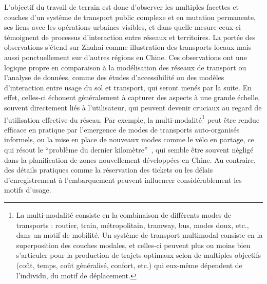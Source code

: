 {L'objectif du travail de terrain est donc d'observer les multiples facettes et couches d'un système de transport public complexe et en mutation permanente, ses liens avec les opérations urbaines visibles, et dans quelle mesure ceux-ci témoignent de processus d'interaction entre réseaux et territoires. La portée des observations s'étend sur Zhuhai comme illustration des transports locaux mais aussi ponctuellement sur d'autres régions en Chine. Ces observations ont une logique propre en comparaison à la modélisation des réseaux de transport ou l'analyse de données, comme des études d'accessibilité ou des modèles d'interaction entre usage du sol et transport, qui seront menés par la suite. En effet, celles-ci échouent généralement à capturer des aspects à une grande échelle, souvent directement liés à l'utilisateur, qui peuvent devenir cruciaux au regard de l'utilisation effective du réseau. Par exemple, la multi-modalité\footnote{La multi-modalité consiste en la combinaison de différents modes de transports : routier, train, métropolitain, tramway, bus, modes doux, etc., dans un motif de mobilité. Un système de transport multimodal consiste en la superposition des couches modales, et celles-ci peuvent plus ou moins bien s'articuler pour la production de trajets optimaux selon de multiples objectifs (coût, temps, coût généralisé, confort, etc.) qui eux-même dépendent de l'individu, du motif de déplacement.} peut être rendue efficace en pratique par l'emergence de modes de transports auto-organisés informels, ou la mise en place de nouveaux modes comme le vélo en partage, ce qui résout le ``problème du dernier kilomètre''~\cite{liu2012solving}, qui semble être souvent négligé dans la planification de zones nouvellement développées en Chine. Au contraire, des détails pratiques comme la réservation des tickets ou les délais d'enregistrement à l'embarquement peuvent influencer considérablement les motifs d'usage.
}




